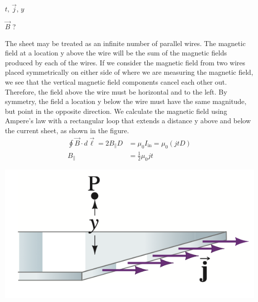 \begin{description}[labelwidth=1.5cm, leftmargin=!]
    \item[Geg. :] $t$, $\Vec{j}$, $y$
    \item[Gevr. :]  $\Vec{B}$ ?
    \item[Opl. :]
    \item[]
        \vspace{-0.7cm}
        \begin{minipage}{0.69\textwidth}
            The sheet may be treated as an infinite number of parallel wires. The magnetic field at a location y above the wire will be the sum of the magnetic fields produced by each of the wires. If we consider
            the magnetic field from two wires placed symmetrically on either side of where we are measuring the magnetic field, we see that the vertical magnetic field components cancel each other out. 
            Therefore, the field above the wire must be horizontal and to the left.  By symmetry, the field a location y below the wire must have the same magnitude, but point in the opposite direction. We calculate the magnetic field using Ampere’s law with a rectangular loop that extends a distance y above and below the current sheet, as shown in the figure.
            \begin{align*}
                \oint \Vec{B} \cdot d\Vec{\ell} = 2B_{\parallel}D &= \mu_0 I_{\text{in}} = \mu_0 (jtD) \\
                B_{\parallel} &= \tfrac{1}{2}\mu_0jt
            \end{align*}
        \end{minipage}
        \begin{minipage}{0.27\textwidth}
            \includegraphics[scale = 0.4]{oz03/resources/Oz3Oef2.png} 
            \vspace{1cm}

\end{minipage}
\end{description}
